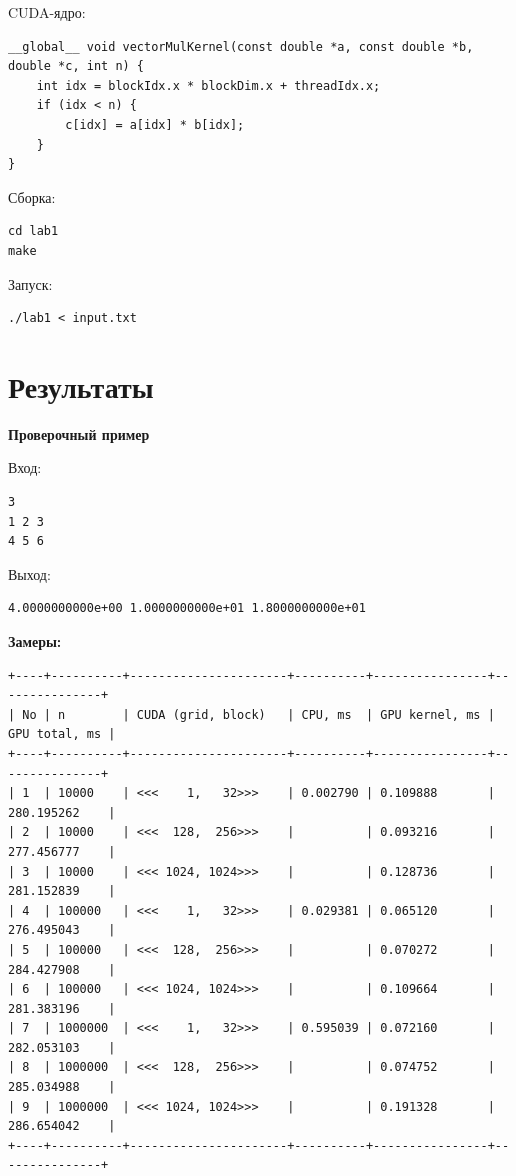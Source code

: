 \documentclass[a4paper,14pt]{extarticle}
\begin{document}
CUDA-ядро:
\begin{lstlisting}[style=cudastyle]
__global__ void vectorMulKernel(const double *a, const double *b, double *c, int n) {
    int idx = blockIdx.x * blockDim.x + threadIdx.x;
    if (idx < n) {
        c[idx] = a[idx] * b[idx];
    }
}
\end{lstlisting}

Сборка:
\begin{lstlisting}[style=cudastyle]
cd lab1
make
\end{lstlisting}

Запуск:
\begin{lstlisting}[style=cudastyle]
./lab1 < input.txt
\end{lstlisting}

\section*{Результаты}
\textbf{Проверочный пример}

Вход:
\begin{lstlisting}[style=cudastyle]
3
1 2 3
4 5 6
\end{lstlisting}

Выход:
\begin{lstlisting}[style=cudastyle]
4.0000000000e+00 1.0000000000e+01 1.8000000000e+01
\end{lstlisting}

\vspace{0.4cm}
\textbf{Замеры:}

\begin{lstlisting}[basicstyle=\ttfamily\scriptsize,frame=single]
+----+----------+----------------------+----------+----------------+---------------+
| No | n        | CUDA (grid, block)   | CPU, ms  | GPU kernel, ms | GPU total, ms |
+----+----------+----------------------+----------+----------------+---------------+
| 1  | 10000    | <<<    1,   32>>>    | 0.002790 | 0.109888       | 280.195262    |
| 2  | 10000    | <<<  128,  256>>>    |          | 0.093216       | 277.456777    |
| 3  | 10000    | <<< 1024, 1024>>>    |          | 0.128736       | 281.152839    |
| 4  | 100000   | <<<    1,   32>>>    | 0.029381 | 0.065120       | 276.495043    |
| 5  | 100000   | <<<  128,  256>>>    |          | 0.070272       | 284.427908    |
| 6  | 100000   | <<< 1024, 1024>>>    |          | 0.109664       | 281.383196    |
| 7  | 1000000  | <<<    1,   32>>>    | 0.595039 | 0.072160       | 282.053103    |
| 8  | 1000000  | <<<  128,  256>>>    |          | 0.074752       | 285.034988    |
| 9  | 1000000  | <<< 1024, 1024>>>    |          | 0.191328       | 286.654042    |
+----+----------+----------------------+----------+----------------+---------------+
\end{lstlisting}
\end{document}
